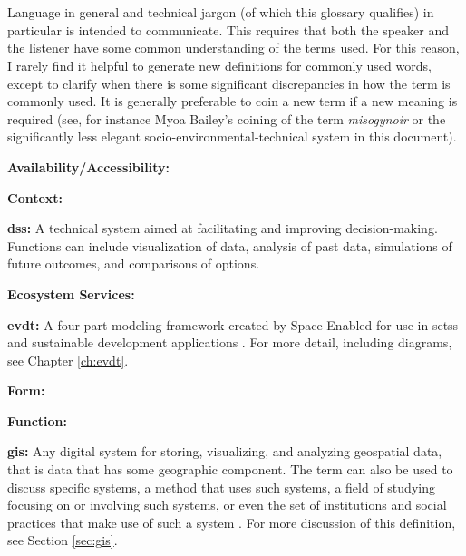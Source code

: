 \chapter{}

Language in general and technical jargon (of which this glossary qualifies) in particular is intended to communicate. This requires that both the speaker and the listener have some common understanding of the terms used. For this reason, I rarely find it helpful to generate new definitions for commonly used words, except to clarify when there is some significant discrepancies in how the term is commonly used. It is generally preferable to coin a new term if a new meaning is required (see, for instance Myoa Bailey's coining of the term \textit{misogynoir} \cite{baileyMoreOriginMisogynoir} or the significantly less elegant socio-environmental-technical system in this document).  

\textbf{Availability/Accessibility:}


\textbf{Context:}

\textbf{\acf{dss}:} A technical system aimed at facilitating and improving decision-making. Functions can include visualization of data, analysis of past data, simulations of future outcomes, and comparisons of options.

\textbf{Ecosystem Services:}

\textbf{\acf{evdt}:} A four-part modeling framework created by Space Enabled for use in \acp{sets} and sustainable development applications \cite{reidCombiningSocialEnvironmental2019}. For more detail, including diagrams, see Chapter \ref{ch:evdt}.

\textbf{Form:}

\textbf{Function:}

\textbf{\acf{gis}:} Any digital system for storing, visualizing, and analyzing geospatial data, that is data that has some geographic component. The term can also be used to discuss specific systems, a method that uses such systems, a field of studying focusing on or involving such systems, or even the set of institutions and social practices that make use of such a system \cite{sheppardGISSocietyResearch1995}. For more discussion of this definition, see Section \ref{sec:gis}.

